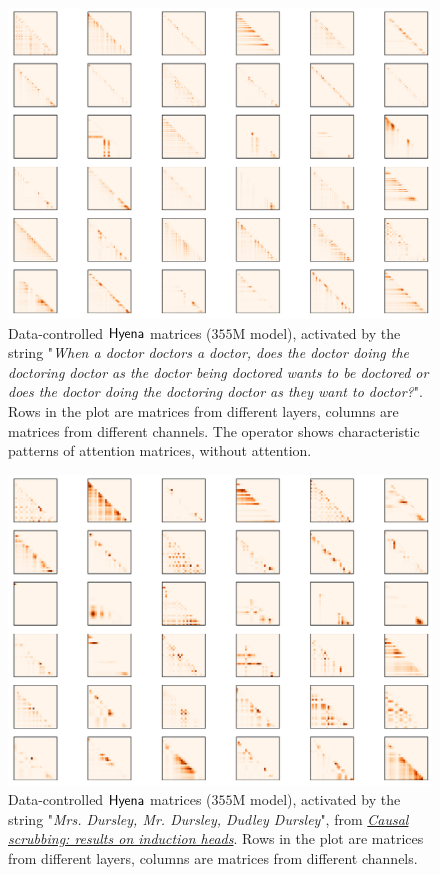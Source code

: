 \begin{figure}[h]
    \centering
    \includegraphics[width=\linewidth]{figures/hyena_doctor.pdf}
    \caption{Data-controlled ${\sf Hyena}$ matrices ($355$M model), activated by the string "\textit{When a doctor doctors a doctor, does the doctor doing the doctoring doctor as the doctor being doctored wants to be doctored or does the doctor doing the doctoring doctor as they want to doctor?}". Rows in the plot are matrices from different layers, columns are matrices from different channels. The operator shows characteristic patterns of attention matrices, without attention.}
    \label{fig:visu}
\end{figure}
\begin{figure}[h]
    \centering
    \includegraphics[width=\linewidth]{figures/hyena_dursley.pdf}
    \caption{Data-controlled ${\sf Hyena}$ matrices ($355$M model), activated by the string "\textit{Mrs. Dursley, Mr. Dursley, Dudley Dursley}", from \href{ttps://www.lesswrong.com/posts/j6s9H9SHrEhEfuJnq/causal-scrubbing-results-on-induction-heads}{\textit{Causal scrubbing: results on induction heads}}. Rows in the plot are matrices from different layers, columns are matrices from different channels.}
    \label{fig:visu2}
\end{figure}

